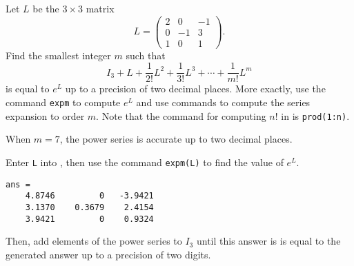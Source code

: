 \documentclass{ximera}
\begin{document}
\begin{exercise} \label{c6.2.1}
Let $L$ be the $3\times 3$ matrix
\[
     L = \left(\begin{array}{rrr}
    2 & 0 & -1\\
    0 & -1 & 3\\
    1 & 0 & 1
               \end{array}\right).
\]
Find the smallest integer $m$ such that
\[
  I_3+L+\frac{1}{2!} L^2 + \frac{1}{3!} L^3 + \cdots
  + \frac{1}{m!} L^m
\]
is equal to $e^L$ up to a precision of two decimal places.  More
exactly, use the \Matlab command {\tt expm} to compute $e^L$ and
use \Matlab commands to compute the series expansion to order $m$.  Note
that the command for computing $n!$ in \Matlab is
{\tt prod(1:n)}.

\begin{solution}

\ans When $m = 7$, the power series is accurate up to two decimal places.

\soln Enter {\tt L} into \Matlab, then use the command {\tt expm(L)} to
find the value of $e^L$.
\begin{verbatim}
ans = 
    4.8746         0   -3.9421
    3.1370    0.3679    2.4154
    3.9421         0    0.9324
\end{verbatim}
Then, add elements of the power series to $I_3$ until this answer is
is equal to the \Matlab generated answer up to a precision of two
digits.

\end{solution}
\end{exercise}
\end{document}
